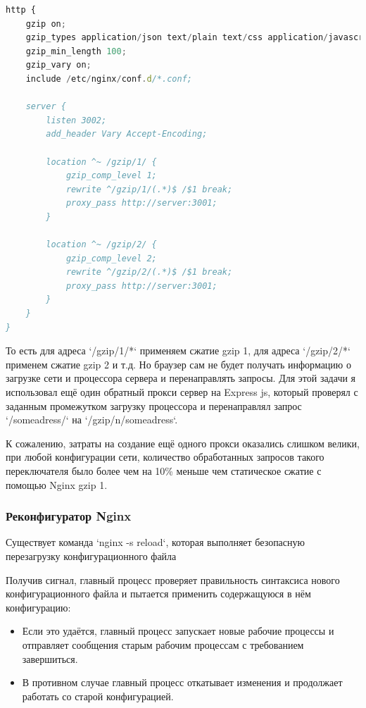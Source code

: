 \documentclass[12pt]{article}
\begin{document}
\begin{lstlisting}[language=JavaScript]
http {
    gzip on;
    gzip_types application/json text/plain text/css application/javascript application/xml;
    gzip_min_length 100;
    gzip_vary on;
    include /etc/nginx/conf.d/*.conf;

    server {
        listen 3002;
        add_header Vary Accept-Encoding;

        location ^~ /gzip/1/ {
            gzip_comp_level 1;
            rewrite ^/gzip/1/(.*)$ /$1 break;
            proxy_pass http://server:3001;
        }

        location ^~ /gzip/2/ {
            gzip_comp_level 2;
            rewrite ^/gzip/2/(.*)$ /$1 break;
            proxy_pass http://server:3001;
        }
    }
}
\end{lstlisting}

То есть для адреса `/gzip/1/*` применяем сжатие gzip 1, для адреса `/gzip/2/*` применем сжатие gzip 2 и т.д. Но браузер сам не будет получать информацию о загрузке сети и процессора сервера и перенаправлять запросы. Для этой задачи я использовал ещё один обратный прокси сервер на Express js, который проверял с заданным промежутком загрузку процессора и перенаправлял запрос `/someadress/` на `/gzip/n/someadress`.

К сожалению, затраты на создание ещё одного прокси оказались слишком велики, при любой конфигурации сети, количество обработанных запросов такого переключателя было более чем на 10\% меньше чем статическое сжатие с помощью Nginx gzip 1.

\subsubsection{Реконфигуратор Nginx }

Существует команда `nginx -s reload`, которая выполняет безопасную перезагрузку конфигурационного файла

Получив сигнал, главный процесс проверяет правильность синтаксиса нового конфигурационного файла и пытается применить содержащуюся в нём конфигурацию:
\begin{itemize}
    \item Если это удаётся, главный процесс запускает новые рабочие процессы и отправляет сообщения старым рабочим процессам с требованием завершиться.
    \item В противном случае главный процесс откатывает изменения и продолжает работать со старой конфигурацией.
\end{itemize}
\end{document}
